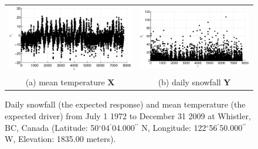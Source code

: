 \begin{figure}[ht]
\begin{tabular}{cc}
\includegraphics[scale=0.48]{WhistlerDailyExample_X.eps} & \includegraphics[scale=0.48]{WhistlerDailyExample_Y.eps} \\
(a) mean temperature $\mathbf{X}$ & (b) daily snowfall $\mathbf{Y}$
\end{tabular}
\caption{Daily snowfall (the expected response) and mean temperature (the expected driver) from July 1 1972 to December 31 2009 at Whistler, BC, Canada (Latitude: 50$^\circ$04$^\prime$04.000$^{\prime\prime}$ N, Longitude: 122$^\circ$56$^\prime$50.000$^{\prime\prime}$ W, Elevation: 1835.00 meters).}
\label{fig:WhistSnowxyplot}
\end{figure}


